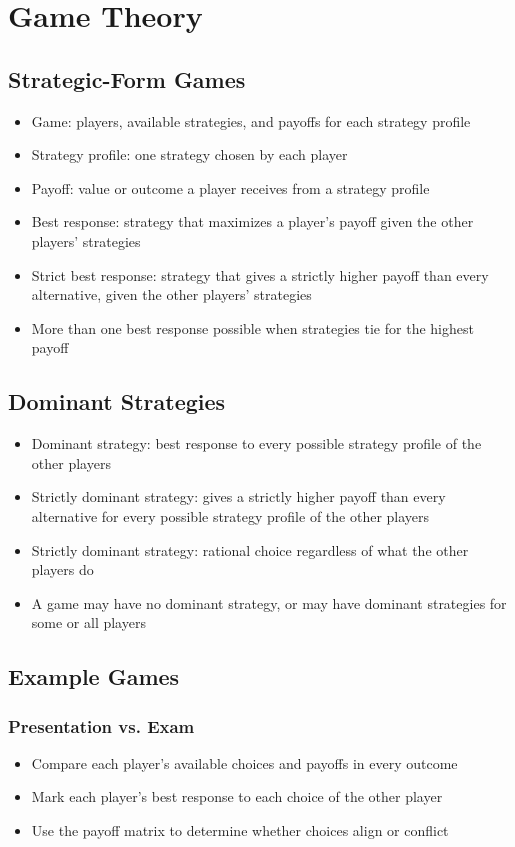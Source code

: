 \chapter{Game Theory}

\section{Strategic-Form Games}
\begin{itemize}
    \item Game: players, available strategies, and payoffs for each strategy profile
    \item Strategy profile: one strategy chosen by each player
    \item Payoff: value or outcome a player receives from a strategy profile
    \item Best response: strategy that maximizes a player's payoff given the other players' strategies
    \item Strict best response: strategy that gives a strictly higher payoff than every alternative, given the other players' strategies
    \item More than one best response possible when strategies tie for the highest payoff
\end{itemize}

\section{Dominant Strategies}
\begin{itemize}
    \item Dominant strategy: best response to every possible strategy profile of the other players
    \item Strictly dominant strategy: gives a strictly higher payoff than every alternative for every possible strategy profile of the other players
    \item Strictly dominant strategy: rational choice regardless of what the other players do
    \item A game may have no dominant strategy, or may have dominant strategies for some or all players
\end{itemize}

\section{Example Games}
\subsection{Presentation vs. Exam}
\begin{itemize}
    \item Compare each player's available choices and payoffs in every outcome
    \item Mark each player's best response to each choice of the other player
    \item Use the payoff matrix to determine whether choices align or conflict
\end{itemize}

